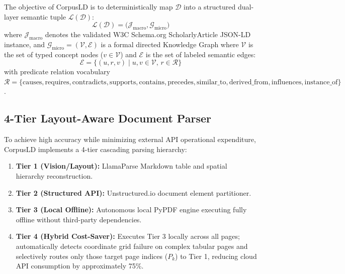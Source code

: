 \documentclass[conference]{IEEEtran}
\begin{document}
The objective of CorpusLD is to deterministically map $\mathcal{D}$ into a structured dual-layer semantic tuple $\mathcal{L}(\mathcal{D})$:
\begin{equation}
\mathcal{L}(\mathcal{D}) = \big( \mathcal{J}_{\text{macro}}, \mathcal{G}_{\text{micro}} \big)
\end{equation}
where $\mathcal{J}_{\text{macro}}$ denotes the validated W3C Schema.org ScholarlyArticle JSON-LD instance, and $\mathcal{G}_{\text{micro}} = (\mathcal{V}, \mathcal{E})$ is a formal directed Knowledge Graph where $\mathcal{V}$ is the set of typed concept nodes ($v \in \mathcal{V}$) and $\mathcal{E}$ is the set of labeled semantic edges:
\begin{equation}
\mathcal{E} = \{ (u, r, v) \mid u, v \in \mathcal{V}, \, r \in \mathcal{R} \}
\end{equation}
with predicate relation vocabulary $\mathcal{R} = \{\text{causes}, \text{requires}, \text{contradicts}, \text{supports}, \text{contains}, \text{precedes}, \text{similar\_to}, \text{derived\_from}, \text{influences}, \text{instance\_of}\}$.

\subsection{4-Tier Layout-Aware Document Parser}
To achieve high accuracy while minimizing external API operational expenditure, CorpusLD implements a 4-tier cascading parsing hierarchy:
\begin{enumerate}
    \item \textbf{Tier 1 (Vision/Layout):} LlamaParse Markdown table and spatial hierarchy reconstruction.
    \item \textbf{Tier 2 (Structured API):} Unstructured.io document element partitioner.
    \item \textbf{Tier 3 (Local Offline):} Autonomous local PyPDF engine executing fully offline without third-party dependencies.
    \item \textbf{Tier 4 (Hybrid Cost-Saver):} Executes Tier 3 locally across all pages; automatically detects coordinate grid failure on complex tabular pages and selectively routes only those target page indices ($P_k$) to Tier 1, reducing cloud API consumption by approximately 75\%.
\end{enumerate}
\end{document}
